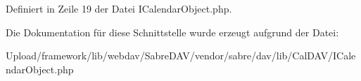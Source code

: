 Definiert in Zeile 19 der Datei I\+Calendar\+Object.\+php.



Die Dokumentation für diese Schnittstelle wurde erzeugt aufgrund der Datei\+:\begin{DoxyCompactItemize}
\item 
Upload/framework/lib/webdav/\+Sabre\+D\+A\+V/vendor/sabre/dav/lib/\+Cal\+D\+A\+V/I\+Calendar\+Object.\+php\end{DoxyCompactItemize}
